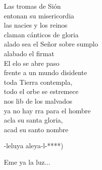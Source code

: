 \begin{cancion}
	\jump
	Las tromas de Sión \\
	\jump
entonan su misericordia\\
	las nacies y los reinos \\
	\jump
claman cánticos de gloria\\
	alado sea el Señor sobre sumplo\\
	alabado el firmat \\
	\jump
	El elo se abre paso \\
	\jump
frente a un mundo disidente\\
	toda  Tierra contempla, \\
	\jump
todo el orbe se estremece\\
	nos lib de los malvados \\
	ya no hay rra para el hombre\\
	acla su santa gloria,\\
	 acad su santo nombre\jump\\
	\begin{chorus}%
		-leluya aleya-l-****)\jump\\
	\end{chorus}%
	\jump
	Eme ya la luz...\\
	\jump
\end{cancion}%
